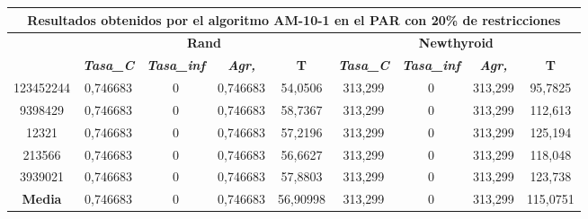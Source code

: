 \documentclass[12pt, spanish]{article}
\begin{document}
\begin{table}[H]
\footnotesize
\begin{tabular}{|c|c|c|c|c|c|c|c|c|}
\hline
\multicolumn{9}{|c|}{\textbf{Resultados obtenidos por el algoritmo AM-10-1 en el PAR con 20\% de restricciones}}                                                                                                  \\ \hline
\multirow{2}{*}{} & \multicolumn{4}{c|}{\textbf{Rand}}                                                            & \multicolumn{4}{c|}{\textbf{Newthyroid}}                                                      \\ \cline{2-9} 
                  & \textit{\textbf{Tasa\_C}} & \textit{\textbf{Tasa\_inf}} & \textit{\textbf{Agr,}} & \textbf{T} & \textit{\textbf{Tasa\_C}} & \textit{\textbf{Tasa\_inf}} & \textit{\textbf{Agr,}} & \textbf{T} \\ \hline
123452244         & 0,746683                  & 0                           & 0,746683               & 54,0506    & 313,299                   & 0                           & 313,299                & 95,7825    \\ \hline
9398429           & 0,746683                  & 0                           & 0,746683               & 58,7367    & 313,299                   & 0                           & 313,299                & 112,613    \\ \hline
12321             & 0,746683                  & 0                           & 0,746683               & 57,2196    & 313,299                   & 0                           & 313,299                & 125,194    \\ \hline
213566            & 0,746683                  & 0                           & 0,746683               & 56,6627    & 313,299                   & 0                           & 313,299                & 118,048    \\ \hline
3939021           & 0,746683                  & 0                           & 0,746683               & 57,8803    & 313,299                   & 0                           & 313,299                & 123,738    \\ \hline
\textbf{Media}    & 0,746683                  & 0                           & 0,746683               & 56,90998   & 313,299                   & 0                           & 313,299                & 115,0751   \\ \hline
\end{tabular}
\end{table}
\end{document}
